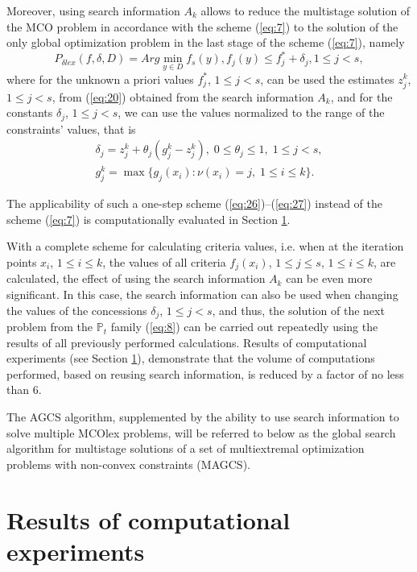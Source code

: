 \documentclass[smallextended]{svjour3}       %
\begin{document}
Moreover, using search information $A_k$ allows to reduce the multistage solution of the MCO problem in accordance with the scheme (\ref{eq:7}) to the solution of the only global optimization problem in the last stage of the scheme (\ref{eq:7}), namely 
\begin{equation}\label{eq:26}
P_{\delta lex} (f,\delta,D)=Arg \min_{y\in D}{f_s(y)}, f_j(y)\leq f_j^*+\delta_j, 1 \leq j < s,
\end{equation}
where for the unknown a priori values $f_j^*$, $1 \leq j < s$, can be used the estimates $z_j^k$, $1 \leq j < s$, from (\ref{eq:20}) obtained from the search information $A_k$,  and for the constants $\delta_j$, $1 \leq j<s$, we can use the values normalized to the range of the constraints' values, that is
\begin{equation}\label{eq:27}
	\begin{matrix}
	\delta_j=z_j^k+\theta_j (g_j^k-z_j^k ),\; 0\leq \theta_j\leq 1, \; 1 \leq j < s,\\
	g_j^k= \max{\{ g_j (x_i ) : \nu(x_i)=j,\; 1\leq i\leq k \}}.
	\end{matrix}
\end{equation}

The applicability of such a one-step scheme (\ref{eq:26})--(\ref{eq:27}) instead of the scheme (\ref{eq:7}) is computationally evaluated in Section \ref{sec:4}.

With a complete scheme for calculating criteria values, i.e. when at the iteration points $x_i$, $1 \leq i \leq k$,  the values of all criteria $f_j (x_i)$, $1 \leq j \leq s$, $1 \leq i \leq k$, are calculated, the effect of using the search information $A_k$ can be even more significant. In this case, the search information can also be used when changing the values of the concessions $\delta_j$, $1 \leq j < s$, and thus, the solution of the next problem from the $\mathbb{P}_t$ family (\ref{eq:8}) can be carried out repeatedly using the results of all previously performed calculations. Results of computational experiments (see Section \ref{sec:4}), demonstrate that the volume of computations performed, based on reusing search information, is reduced by a factor of no less than 6.

The AGCS algorithm, supplemented by the ability to use search information to solve multiple MCOlex  problems, will be referred to below as the global search algorithm for multistage solutions of a set of multiextremal optimization problems with non-convex constraints (MAGCS).

\section{Results of computational experiments}
\label{sec:4}
\end{document}
